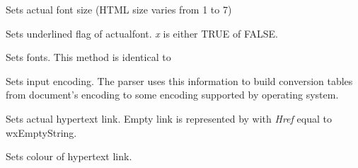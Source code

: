 \label{wxhtmlwinparsersetfontsize}


Sets actual font size (HTML size varies from 1 to 7)

\label{wxhtmlwinparsersetfontunderlined}


Sets underlined flag of actualfont. {\it x} is either TRUE of FALSE.

\label{wxhtmlwinparsersetfonts}


Sets fonts. This method is identical to 

\label{wxhtmlwinparsersetinputencoding}


Sets input encoding. The parser uses this information to build conversion
tables from document's encoding to some encoding supported by operating
system.

\label{wxhtmlwinparsersetlink}


Sets actual hypertext link. Empty link is represented
by  with {\it Href} equal
to wxEmptyString.

\label{wxhtmlwinparsersetlinkcolor}


Sets colour of hypertext link.

